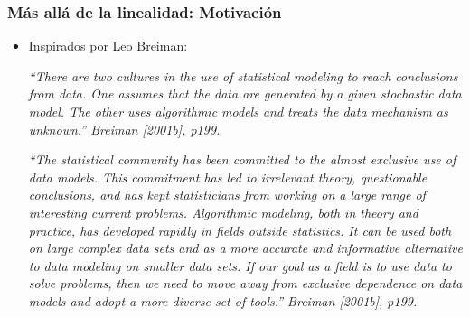 \documentclass[
  shownotes,
  xcolor={svgnames},
  hyperref={colorlinks,citecolor=DarkBlue,linkcolor=DarkRed,urlcolor=DarkBlue}
  , aspectratio=169]{beamer}
\begin{document}
\begin{frame}[fragile]
\frametitle{Más allá de la linealidad: Motivación}

\begin{itemize}
\item Inspirados por Leo Breiman:

\medskip
{\scriptsize
{\it ``There are two cultures in the use of statistical modeling to reach conclusions from data. One assumes that the data are generated by a given stochastic data model. The other uses algorithmic models and treats the data mechanism as unknown.'' Breiman [2001b], p199.}
\medskip

{\it ``The statistical community has been committed to the almost exclusive use of data models. This commitment has led to irrelevant theory, questionable conclusions, and has kept statisticians from working on a large range of interesting current problems. Algorithmic modeling, both in theory and practice, has developed rapidly in fields outside statistics. It can be used both on large complex data sets and as a more accurate and informative alternative to data modeling on smaller data sets. If our goal as a field is to use data to solve problems, then we need to move away from exclusive dependence on data models and adopt a more diverse set of tools.'' Breiman [2001b], p199.}
}
\end{itemize}
\end{frame}
\end{document}

